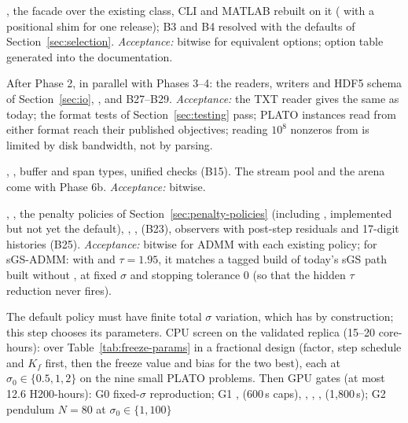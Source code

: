\documentclass[11pt]{article}
\begin{document}
\begin{description}[style=nextline,leftmargin=0.6cm]
\item[Phase 2 --- Options and front-ends.] , the  facade over the existing
class, CLI and MATLAB rebuilt on it ( with a positional shim for one
release); B3 and B4 resolved with the defaults of Section~\ref{sec:selection}.
\emph{Acceptance:} bitwise for equivalent options; option table generated into the documentation.
\item[Phase 2b --- Input and output formats.] After Phase 2, in parallel with Phases 3--4: the readers, writers
and HDF5 schema of Section~\ref{sec:io}, , and B27--B29. \emph{Acceptance:} the TXT reader gives
the same  as today; the format tests of Section~\ref{sec:testing} pass; PLATO instances read from
either format reach their published objectives; reading $10^8$ nonzeros from  is limited by disk
bandwidth, not by parsing.
\item[Phase 3 --- Thin core.] , , buffer and span types, unified checks (B15).
The stream pool and the arena come with Phase 6b. \emph{Acceptance:} bitwise.
\item[Phase 4 --- Algorithm layer.] , , the penalty policies of
Section~\ref{sec:penalty-policies} (including , implemented but not yet the default), ,
,  (B23), observers with post-step residuals and 17-digit histories
(B25). \emph{Acceptance:} bitwise for ADMM with each existing policy; for sGS-ADMM: with  and
$\tau = 1.95$, it matches a tagged build of today's sGS path built without , at
fixed $\sigma$ and stopping tolerance 0 (so that the hidden $\tau$ reduction never fires).
\item[Phase 4b --- Tune and adopt \code{balance_freeze}.] The default policy must have finite total $\sigma$
variation, which  has by construction; this step chooses its parameters. CPU screen
on the validated replica \cite{sigmastudy} (15--20 core-hours):  over
Table~\ref{tab:freeze-params} in a fractional design (factor, step schedule and $K_f$ first, then the freeze
value and bias for the two best), each at $\sigma_0\in\{0.5,1,2\}$ on the nine small PLATO problems. Then GPU
gates (at most 12.6 H200-hours): G0 fixed-$\sigma$ reproduction; G1 ,  (600\,s caps),
, , ,  (1{,}800\,s); G2 pendulum $N=80$ at $\sigma_0\in\{1,100\}$

\end{description}
\end{document}
